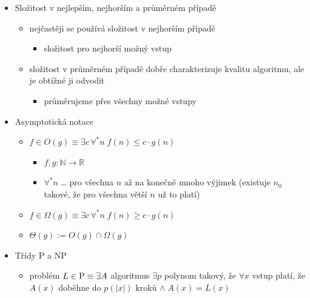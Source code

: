 \begin{itemize}
\begin{itemize}
\begin{itemize}
\item jednotková cena instrukce - omezíme šířku slova na W bitů
\item logaritmická cena instrukce - cena odpovídá počtu bitů operandů včetně adres (je přesný, ale nepohodlný na přemýšlení o algoritmech)
\item relativní logaritmická cena instrukce - u polynomiálně velkých čísel je cena jednotková, u obrovských čísel se cena zvyšuje (tohle budeme reálně používat - i když se k tomu budeme obvykle chovat jako k jednotkové ceně instrukce)
\end{itemize}
\end{itemize}
\item Složitost v nejlepším, nejhorším a průměrném případě
\begin{itemize}
\item nejčastěji se používá složitost v nejhorším případě
\begin{itemize}
\item složitost pro nejhorší možný vstup
\end{itemize}
\item složitost v průměrném případě dobře charakterizuje kvalitu algoritmu, ale je obtížné ji odvodit
\begin{itemize}
\item průměrujeme přes všechny možné vstupy
\end{itemize}
\end{itemize}
\item Asymptotická notace
\begin{itemize}
\item $f\in O(g)\equiv\exists c\,\forall^*n\;f(n)\leq c\cdot g(n)$
\begin{itemize}
\item $f,g:\mathbb N\to\mathbb R$
\item $\forall^*n$ \dots{} pro všechna $n$ až na konečně mnoho výjimek (existuje $n_0$ takové, že pro všechna větší $n$ už to platí)
\end{itemize}
\item $f\in \Omega(g)\equiv\exists c\,\forall^*n\;f(n)\geq c\cdot g(n)$
\item $\Theta(g):= O(g)\cap \Omega(g)$
\end{itemize}
\item Třídy P a NP
\begin{itemize}
\item problém $L\in \text P\equiv\exists A$ algoritmus $\exists p$ polynom takový, že $\forall x$ vstup platí, že $A(x)$ doběhne do $p(|x|)$ kroků $\land\;A(x)=L(x)$

\end{itemize}
\end{itemize}
